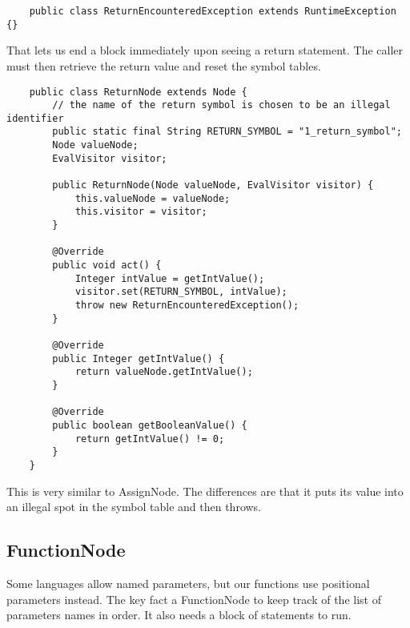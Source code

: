 {\footnotesize
\begin{verbatim}
    public class ReturnEncounteredException extends RuntimeException {}
\end{verbatim}
}

That lets us end a block immediately upon seeing a return statement.
The caller must then retrieve the return value and reset the symbol tables.

{\footnotesize
\begin{verbatim}
    public class ReturnNode extends Node {
        // the name of the return symbol is chosen to be an illegal identifier
        public static final String RETURN_SYMBOL = "1_return_symbol";
        Node valueNode;
        EvalVisitor visitor;
    
        public ReturnNode(Node valueNode, EvalVisitor visitor) {
            this.valueNode = valueNode;
            this.visitor = visitor;
        }
    
        @Override
        public void act() {
            Integer intValue = getIntValue();
            visitor.set(RETURN_SYMBOL, intValue);
            throw new ReturnEncounteredException();
        }
    
        @Override
        public Integer getIntValue() {
            return valueNode.getIntValue();
        }
    
        @Override
        public boolean getBooleanValue() {
            return getIntValue() != 0;
        }
    }
\end{verbatim}
}

This is very similar to AssignNode. The differences are that it puts
its value into an illegal spot in the symbol table and then throws.

\subsection{FunctionNode}

Some languages allow named parameters, but our functions use
positional parameters instead. The key fact a FunctionNode
to keep track of the list of parameters names in order. It also
needs a block of statements to run.

